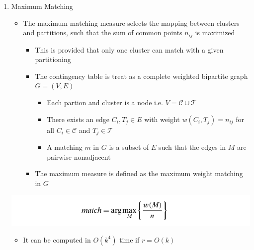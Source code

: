 \documentclass[11pt]{article}
\begin{document}
\begin{enumerate}
\item Maximum Matching
\label{sec:org4c674df}
\begin{itemize}
\item The maximum matching measure selects the mapping between clusters and partitions, such that the sum of common points \(n_{ij}\) is maximized
\begin{itemize}
\item This is provided that only one cluster can match with a given partitioning
\item The contingency table is treat as a complete weighted bipartite graph \(G=(V,E)\)
\begin{itemize}
\item Each partion and cluster is a node i.e. \(V= \mathcal C \cup \mathcal T\)
\item There exists an edge \(C_i, T_j \in E\) with weight \(w(C_i, T_j)= n_{ij}\) for all \(C_i \in \mathcal C\) and \(T_j \in \mathcal T\)
\item A matching \(m\) in \(G\) is a subset of \(E\) such that the edges in \(M\) are pairwise nonadjacent
\end{itemize}
\item The maximum measure is defined as the maximum weight matching in \(G\)
\end{itemize}
\end{itemize}
\begin{center}
\includegraphics[width=.9\linewidth]{Clustering Validation/screenshot_2018-11-27_22-48-16.png}
\end{center}
\begin{itemize}
\item It can be computed in \(O(k^4)\) time if \(r=O(k)\)
\end{itemize}


\end{enumerate}
\end{document}
